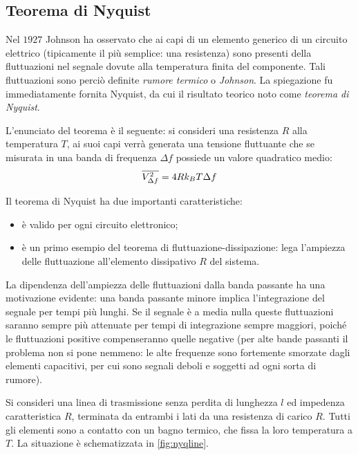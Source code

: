 \subsection{Teorema di Nyquist}

Nel $ 1927 $ Johnson ha osservato che ai capi di un elemento generico di un circuito elettrico (tipicamente il più semplice: una resistenza) sono presenti della fluttuazioni nel segnale dovute alla temperatura finita del componente. Tali fluttuazioni sono perciò definite \textit{rumore termico} o \textit{Johnson}.
La spiegazione fu immediatamente fornita Nyquist, da cui il risultato teorico noto come \textit{teorema di Nyquist}.
\newline

L'enunciato del teorema è il seguente: si consideri una resistenza $ R $ alla temperatura $ T $, ai suoi capi verrà generata una tensione fluttuante che se misurata in una banda di frequenza $ \Delta f $ possiede un valore quadratico medio:
\[ \overline{V_{\Delta f}^2} = 4 R k_B T \Delta f \]

Il teorema di Nyquist ha due importanti caratteristiche:
\begin{itemize}
	\item è valido per ogni circuito elettronico;
	\item è un primo esempio del teorema di fluttuazione-dissipazione: lega l'ampiezza delle fluttuazione all'elemento dissipativo $ R $ del sistema.
\end{itemize}

\begin{oss}
	La dipendenza dell'ampiezza delle fluttuazioni dalla banda passante ha una motivazione evidente: una banda passante minore implica l'integrazione del segnale per tempi più lunghi. Se il segnale è a media nulla queste fluttuazioni saranno sempre più attenuate per tempi di integrazione sempre maggiori, poiché le fluttuazioni positive compenseranno quelle negative (per alte bande passanti il problema non si pone nemmeno: le alte frequenze sono fortemente smorzate dagli elementi capacitivi, per cui sono segnali deboli e soggetti ad ogni sorta di rumore).
\end{oss}

Si consideri una linea di trasmissione senza perdita di lunghezza $ l $ ed impedenza caratteristica $ R $, terminata da entrambi i lati da una resistenza di carico $ R $.
Tutti gli elementi sono a contatto con un bagno termico, che fissa la loro temperatura a $ T $. La situazione è schematizzata in \cref{fig:nyqline}.

